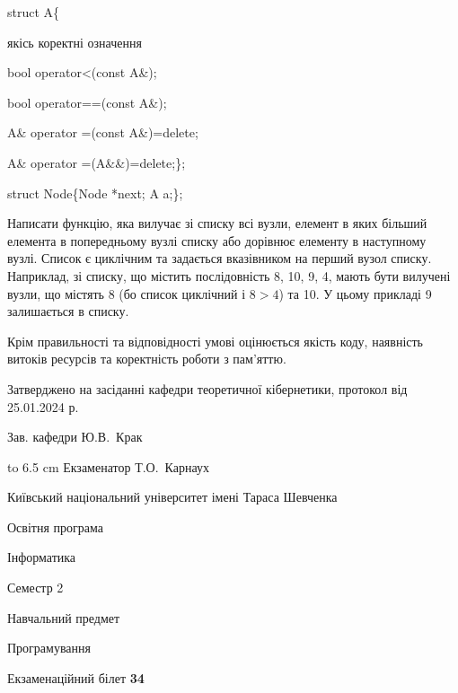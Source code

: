 \documentclass[12pt, ukrainian]{article}
\begin{document}
{struct A\{

\quad  якісь коректні означення 

\quad  bool operator<(const A\&); 

\quad  bool operator==(const A\&); 

\quad A\& operator =(const A\&)=delete; 

\quad  A\& operator =(A\&\&)=delete;\};

struct Node\{Node *next; A a;\};

 Написати функцію, яка вилучає зі списку всі вузли, елемент в яких більший елемента в попередньому вузлі списку або дорівнює елементу в наступному вузлі. Список є циклічним та задається вказівником на перший вузол списку. Наприклад, зі списку, що містить послідовність 8, 10, 9, 4, мають бути вилучені вузли, що містять 8 (бо список циклічний і $8>4$) та 10. У цьому прикладі 9 залишається в списку.

Крім правильності та відповідності умові оцінюється якість коду, наявність витоків ресурсів та коректність роботи з пам'яттю. 

}
{\smallskip\smallskip \begin {scriptsize} Затверджено на засіданні кафедри теоретичної кібернетики, протокол   від   25.01.2024 р.\par\smallskip\smallskip\smallskip\smallskip
{\parbox {6.5 cm} {Зав. кафедри \dotfill Ю.В.~Крак}}\hspace {0.7cm} {\hbox to 6.5 cm { Екзаменатор \dotfill Т.О.~Карнаух}} \end{scriptsize}}
\newpage
{{\begin {scriptsize}\par
{ \center  Київський національний університет імені Тараса Шевченка \par}
{\parbox {5 cm}{Освітня програма \hfill}{\parbox {7 cm}{Інформатика\hfill}}\parbox {6 cm}{\hfill Семестр 2}}\par
{\parbox {5 cm} {Навчальний предмет \hfill}\parbox {7 cm}{Програмування \hfill}\parbox {6cm}{\hfill}\par}\vspace{-15pt} \end{scriptsize}}{\center Екзаменаційний білет \No \textbf { 34 }\par}}
\end{document}
